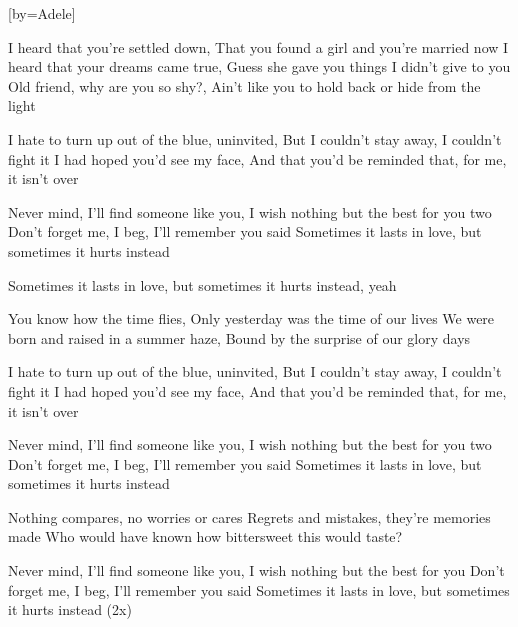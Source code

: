 

[by=Adele]




\beginverse
I heard that you're settled down, \brk  That you found a girl and you're married now
I heard that your dreams came true, \brk  Guess she gave you things I didn't give to you
Old friend, why are you so shy?, \brk  Ain't like you to hold back or hide from the light
\endverse

\beginverse
I hate to turn up out of the blue, uninvited, \brk  But I couldn't stay away, I couldn't fight it
I had hoped you'd see my face, \brk  And that you'd be reminded that, for me, it isn't over
\endverse

\beginchorus
Never mind, I'll find someone like you, \brk  I wish nothing but the best for you two
Don't forget me, I beg, \brk  I'll remember you said
Sometimes it lasts in love, but sometimes it hurts instead
\endchorus

\beginchorus
Sometimes it lasts in love, but sometimes it hurts instead, yeah
\endchorus

\beginverse
You know how the time flies, \brk  Only yesterday was the time of our lives
We were born and raised in a summer haze, \brk  Bound by the surprise of our glory days
\endverse

\beginverse
I hate to turn up out of the blue, uninvited, \brk  But I couldn't stay away, I couldn't fight it
I had hoped you'd see my face, \brk  And that you'd be reminded that, for me, it isn't over
\endverse

\beginchorus
Never mind, I'll find someone like you, \brk  I wish nothing but the best for you two
Don't forget me, I beg, \brk  I'll remember you said
Sometimes it lasts in love, but sometimes it hurts instead
\endchorus

\beginverse
Nothing compares, no worries or cares
Regrets and mistakes, they're memories made
Who would have known how bittersweet this would taste?
\endverse

\beginchorus
{} 
Never mind, I'll find someone like you, \brk  I wish nothing but the best for you
Don't forget me, I beg, \brk  I'll remember you said
Sometimes it lasts in love, but sometimes it hurts instead  (2x)
\endchorus



\endsong
